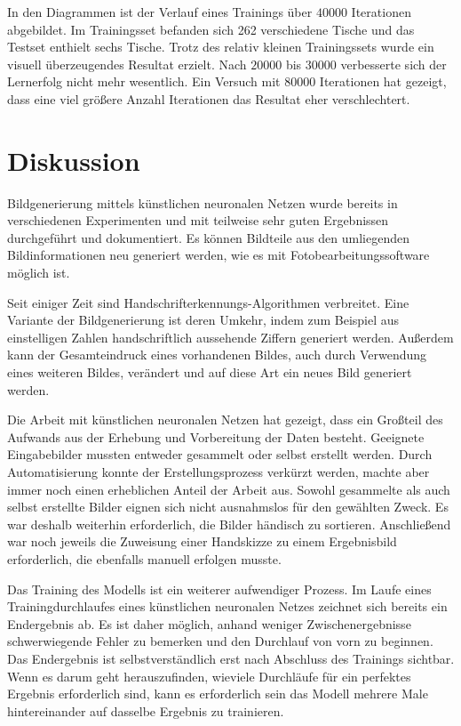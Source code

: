 \clearpage

In den Diagrammen ist der Verlauf eines Trainings über $40000$ Iterationen abgebildet. Im Trainingsset befanden sich 262 verschiedene Tische und das Testset enthielt sechs Tische. Trotz des relativ kleinen Trainingssets wurde ein visuell überzeugendes Resultat erzielt. Nach $20000$ bis $30000$ verbesserte sich der Lernerfolg nicht mehr wesentlich. Ein Versuch mit $80000$ Iterationen hat gezeigt, dass eine viel größere Anzahl Iterationen das Resultat eher verschlechtert.

\chapter{Diskussion}
\label{sec:conclusion}
Bildgenerierung mittels künstlichen neuronalen Netzen wurde bereits in verschiedenen Experimenten und mit teilweise sehr guten Ergebnissen durchgeführt und dokumentiert. Es können Bildteile aus den umliegenden Bildinformationen neu generiert werden, wie es mit Fotobearbeitungssoftware möglich ist.

Seit einiger Zeit sind Handschrifterkennungs-Algorithmen verbreitet. Eine Variante der Bildgenerierung ist deren Umkehr, indem zum Beispiel aus einstelligen Zahlen handschriftlich aussehende Ziffern generiert werden. Außerdem kann der Gesamteindruck eines vorhandenen Bildes, auch durch Verwendung eines weiteren Bildes, verändert und auf diese Art ein neues Bild generiert werden.

Die Arbeit mit künstlichen neuronalen Netzen hat gezeigt, dass ein Großteil des Aufwands aus der Erhebung und Vorbereitung der Daten besteht. Geeignete Eingabebilder mussten entweder gesammelt oder selbst erstellt werden. Durch Automatisierung konnte der Erstellungsprozess verkürzt werden, machte aber immer noch einen erheblichen Anteil der Arbeit aus. Sowohl gesammelte als auch selbst erstellte Bilder eignen sich nicht ausnahmslos für den gewählten Zweck. Es war deshalb weiterhin erforderlich, die Bilder händisch zu sortieren. Anschließend war noch jeweils die Zuweisung einer Handskizze zu einem Ergebnisbild erforderlich, die ebenfalls manuell erfolgen musste.

Das Training des Modells ist ein weiterer aufwendiger Prozess. Im Laufe eines Trainingdurchlaufes eines künstlichen neuronalen Netzes zeichnet sich bereits ein Endergebnis ab. Es ist daher möglich, anhand weniger Zwischenergebnisse schwerwiegende Fehler zu bemerken und den Durchlauf von vorn zu beginnen. Das Endergebnis ist selbstverständlich erst nach Abschluss des Trainings sichtbar. Wenn es darum geht herauszufinden, wieviele Durchläufe für ein perfektes Ergebnis erforderlich sind, kann es erforderlich sein das Modell mehrere Male hintereinander auf dasselbe Ergebnis zu trainieren.

